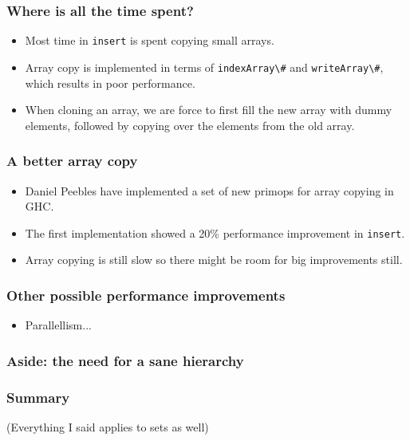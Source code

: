 \documentclass{beamer}
\begin{document}
\begin{frame}
  \frametitle{Where is all the time spent?}

  \begin{itemize}
  \item Most time in \lstinline!insert! is spent copying small arrays.
  \item Array copy is implemented in terms of \lstinline!indexArray\#!
    and \lstinline!writeArray\#!, which results in poor performance.
  \item When cloning an array, we are force to first fill the new
    array with dummy elements, followed by copying over the elements
    from the old array.
  \end{itemize}
\end{frame}

\begin{frame}
  \frametitle{A better array copy}

  \begin{itemize}
  \item Daniel Peebles have implemented a set of new primops for array
    copying in GHC.
  \item The first implementation showed a 20\% performance improvement
    in \lstinline!insert!.
  \item Array copying is still slow so there might be room for big
    improvements still.
  \end{itemize}
\end{frame}

\begin{frame}
  \frametitle{Other possible performance improvements}
  \begin{itemize}
  \item Parallellism...
  \end{itemize}
\end{frame}

\begin{frame}
  \frametitle{Aside: the need for a sane hierarchy}
\end{frame}

\begin{frame}
  \frametitle{Summary}
  (Everything I said applies to sets as well)
\end{frame}
\end{document}
